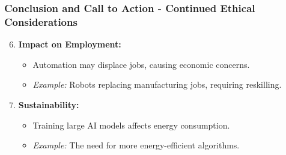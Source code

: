 \documentclass[aspectratio=169]{beamer}
\begin{document}
\begin{frame}[fragile]
    \frametitle{Conclusion and Call to Action - Continued Ethical Considerations}
    
    \begin{enumerate}    
        \setcounter{enumi}{5} %
        \item \textbf{Impact on Employment:}
        \begin{itemize}
            \item Automation may displace jobs, causing economic concerns.
            \item \textit{Example:} Robots replacing manufacturing jobs, requiring reskilling.
        \end{itemize}
        
        \item \textbf{Sustainability:}
        \begin{itemize}
            \item Training large AI models affects energy consumption.
            \item \textit{Example:} The need for more energy-efficient algorithms.
        \end{itemize}
    \end{enumerate}
\end{frame}
\end{document}
